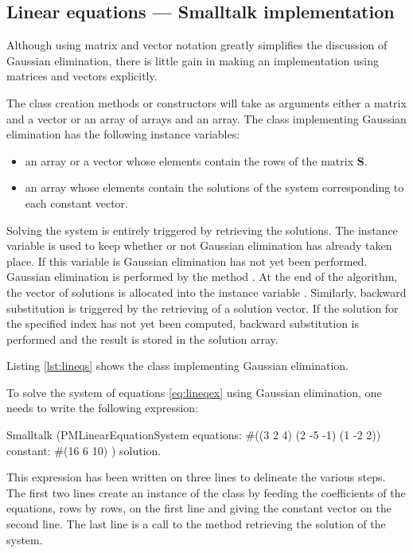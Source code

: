 \subsection{Linear equations --- Smalltalk implementation}
Although using matrix and vector notation greatly simplifies the discussion of Gaussian
elimination, there is little gain in making an implementation
using matrices and vectors explicitly.

The class creation methods or constructors will take as arguments
either a matrix and a vector or an array of arrays and an array.
The class implementing Gaussian elimination has the following
instance variables:
\begin{itemize}
  \item {} an array or a vector whose elements contain the rows of the
  matrix $\textbf{S}$.
  \item {} an array whose elements contain the solutions of the
  system corresponding to each constant vector.
\end{itemize}

Solving the system is entirely triggered by retrieving the
solutions.
The instance variable  is used to keep
whether or not Gaussian elimination has already taken place. If
this variable is  Gaussian elimination has not yet been
performed. Gaussian elimination is performed by the method .
At the end of the algorithm, the vector of solutions is
allocated into the instance variable . Similarly,
backward substitution is triggered by the retrieving of a solution
vector. If the solution for the specified index has not yet been
computed, backward substitution is performed and the result is
stored in the solution array.

Listing \ref{lst:lineqs} shows the class  implementing Gaussian elimination.

To solve the system of equations \ref{eq:lineqex} using Gaussian elimination, one needs to write the following expression:
\begin{displaycode}{Smalltalk}
(PMLinearEquationSystem equations: #((3 2 4)
                                   (2 -5 -1)
                                   (1 -2 2))
                      constant: #(16 6 10)
     ) solution.
\end{displaycode}
This expression has been written on three lines to delineate the
various steps. The first two lines create an instance of the class
 by feeding the coefficients of the
equations, rows by rows, on the first line and giving the constant
vector on the second line. The last line is a call to the method
 retrieving the solution of the system.

